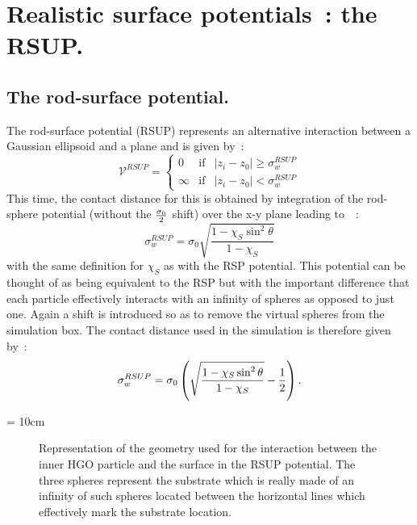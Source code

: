 
\section{Realistic surface potentials~: the RSUP.}
\label{s:realisticPotentials_RSUP}



\subsection{The rod-surface potential.}

The rod-surface potential (RSUP) represents an alternative interaction between a Gaussian 
ellipsoid and a plane and is given by~:
\begin{equation}
	\mathcal{V}^{RSUP} = \left\{	%
	\begin{array}{ccc}
		0	&\mathrm{if}	&|z_i - z_0| \geq \sigma^{RSUP}_w	\\
		\infty	&\mathrm{if}	&|z_i - z_0| < \sigma^{RSUP}_w	
	\end{array}
	\right.
\end{equation}
This time, the contact distance for this is obtained by integration of the rod-sphere potential 
(without the $\frac{\sigma_0}{2}$ shift) over the x-y plane leading to~\cite{rwThesis}~:
%
\begin{equation}
	\sigma^{RSUP}_w = \sigma_0\sqrt{\frac{1-\chi_S\sin^2\theta}{1-\chi_S}}
\end{equation}
%
with the same definition for $\chi_S$ as with the RSP potential. This potential can be thought 
of as being equivalent to the RSP but with the important difference that each particle
effectively interacts  with an infinity 
of spheres as opposed to just one. Again a shift is introduced so as to remove the virtual
spheres from the simulation box. The contact distance used in the simulation is therefore given by~:
\begin{equation}
	\sigma^{RSUP}_w = \sigma_0\left( \sqrt{\frac{1-\chi_S\sin^2\theta}{1-\chi_S}} -
	\frac{1}{2}\right).
\end{equation}


\picW = 10cm
\begin{figure}
	\centering
	\caption[Representation of the geometry used for the interaction between the inner HGO
	particle and the surface in the RSUP potential.]
	{Representation of the geometry used for the interaction between the inner HGO
	particle and the surface in the RSUP potential. The three spheres represent the
	substrate which is really made of an infinity of such spheres located between the horizontal lines 
	which effectively mark the substrate location.}
	\label{fig:RSUPConfig}
\end{figure}

